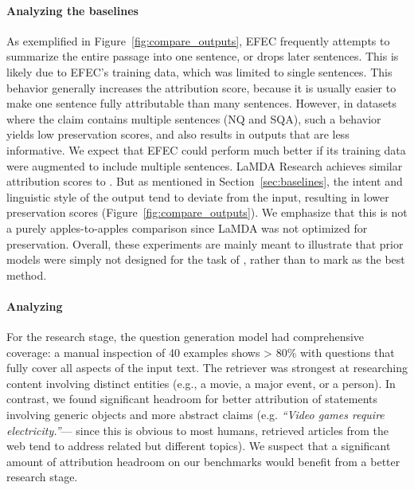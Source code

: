 \paragraph{Analyzing the baselines}

As exemplified in Figure~\ref{fig:compare_outputs},
EFEC frequently attempts to summarize the entire passage into one sentence, or drops later sentences. This is likely due to EFEC's training data, which was limited to single sentences. This behavior generally increases the attribution score, because it is usually easier to make one sentence fully attributable than many sentences.
However, in datasets where the claim contains multiple sentences (NQ and SQA), such a behavior yields low preservation scores, and also results in outputs that are less informative.
We expect that EFEC could perform much better if its training data were augmented to include multiple sentences. LaMDA Research achieves similar attribution scores to \approach{}.
But as mentioned in Section~\ref{sec:baselines}, the intent and linguistic style of the output tend to deviate from the input, resulting in lower preservation scores (Figure~\ref{fig:compare_outputs}).
We emphasize that this is not a purely apples-to-apples comparison since LaMDA was not optimized for preservation.
Overall, these experiments are mainly meant to illustrate that prior models were simply not designed for the task of \taskName, rather than to mark \approach{} as the best method.


\paragraph{Analyzing \approach{}}

For the research stage,
the question generation model had comprehensive coverage:
a manual inspection of 40 examples shows > 80\% with questions that fully cover all aspects of the input text.
The retriever was strongest at researching content involving distinct entities (e.g., a movie, a major event, or a person). In contrast, we found significant headroom for better attribution of statements involving generic objects and more abstract claims (e.g. \emph{``Video games require electricity.''}--- since this is obvious to most humans, retrieved articles from the web tend to address related but different topics).
We suspect that a significant amount of attribution headroom on our benchmarks would benefit from a better  research stage.



